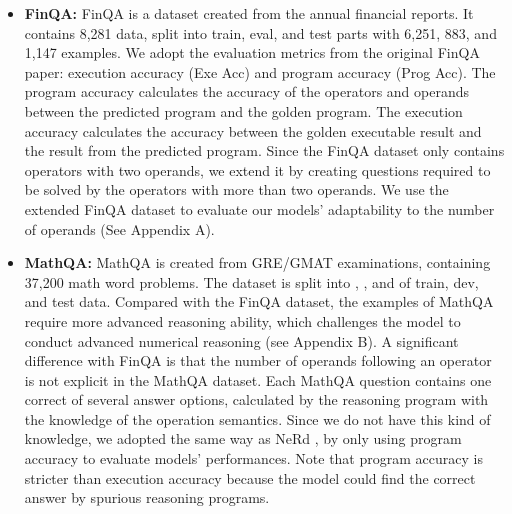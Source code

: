 \documentclass{article}
\begin{document}
\begin{itemize}[leftmargin=*]
\item[] {\bf FinQA:} FinQA is a dataset created from the annual financial reports. It contains 8,281 data, split into train, eval, and test parts with 6,251, 883, and 1,147 examples. We adopt the evaluation metrics from the original FinQA paper: execution accuracy (Exe Acc) and program accuracy (Prog Acc). The program accuracy calculates the accuracy of the operators and operands between the predicted program and the golden program. The execution accuracy calculates the accuracy between the golden executable result and the result from the predicted program. Since the FinQA dataset only contains operators with two operands, we extend it by creating questions required to be solved by the operators with more than two operands. We use the extended FinQA dataset to evaluate our models' adaptability to the number of operands (See Appendix A).
    
\item[] {\bf MathQA:} MathQA is created from GRE/GMAT examinations, containing 37,200 math word problems. The dataset is split into , , and  of train, dev, and test data. Compared with the FinQA dataset, the examples of MathQA require more advanced reasoning ability, which challenges the model to conduct advanced numerical reasoning (see Appendix B). A significant difference with FinQA is that the number of operands following an operator is not explicit in the MathQA dataset. Each MathQA question contains one correct of several answer options, calculated by the reasoning program with the knowledge of the operation semantics. Since we do not have this kind of knowledge, we adopted the same way as NeRd \cite{NeRd}, by only using program accuracy to evaluate models' performances. Note that program accuracy is stricter than execution accuracy because the model could find the correct answer by spurious reasoning programs.
\end{itemize}
\end{document}
